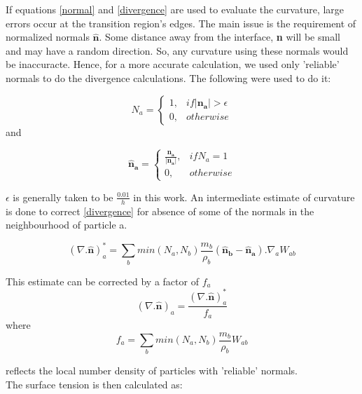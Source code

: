 If equations \ref{normal} and \ref{divergence} are used to evaluate the curvature, large errors occur at the transition region's edges. The main issue is the requirement of normalized normals $\mathbf{\hat n}$. Some distance away from the interface, \textbf{n} will be small and may have a random direction. So, any curvature using these normals would be inaccuracte. Hence, for a more accurate calculation, we used only 'reliable' normals to do the divergence calculations. The following were used to do it:

\begin{equation}
 N_a = 
 \begin{cases}
  1, & if \left|\mathbf{n_a}\right| > \epsilon \\
  0, & otherwise
 \end{cases}
  \label{reliablity}
 \end{equation}
\noindent
and

\begin{equation}
 \mathbf{\hat n_a} = 
 \begin{cases}
  \frac{\mathbf{n_a}}{\left| \mathbf{n_a} \right|}, & if N_a=1 \\
  0, & otherwise
 \end{cases}
\end{equation}

\noindent
$\epsilon$ is generally taken to be $\frac{0.01}{h}$ in this work. An intermediate estimate of curvature is done to correct \ref{divergence} for absence of some of the normals in the neighbourhood of particle a.

\begin{equation}
 \left(\nabla. \mathbf{\hat n}\right)^*_a = \sum_b min(N_a, N_b) \frac{m_b}{\rho_b}(\mathbf{\hat n_b} - \mathbf{\hat n_a}). \nabla_a W_{ab}
\end{equation}

This estimate can be corrected by a factor of $f_a$
\begin{equation}
 (\nabla . \mathbf{\hat n})_a = \frac{(\nabla . \mathbf{\hat n})_a^*}{f_a}
\end{equation}
\noindent
where
\begin{equation}
 f_a = \sum_b min(N_a, N_b) \frac{m_b}{\rho_b} W_{ab}
\end{equation}

\noindent
reflects the local number density of particles with 'reliable' normals. \\

The surface tension is then calculated as:

